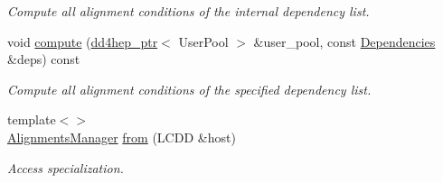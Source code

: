 \begin{DoxyCompactItemize}
\begin{DoxyCompactList}\small\item\em Compute all alignment conditions of the internal dependency list. \item\end{DoxyCompactList}\item 
void \hyperlink{class_d_d4hep_1_1_alignments_1_1_alignments_manager_ab7da4574491fb1e887cbfaabdd44c712}{compute} (\hyperlink{class_d_d4hep_1_1dd4hep__ptr}{dd4hep\_\-ptr}$<$ UserPool $>$ \&user\_\-pool, const \hyperlink{class_d_d4hep_1_1_conditions_1_1_conditions_dependency_collection}{Dependencies} \&deps) const 
\begin{DoxyCompactList}\small\item\em Compute all alignment conditions of the specified dependency list. \item\end{DoxyCompactList}\item 
{\footnotesize template$<$$>$ }\\\hyperlink{class_d_d4hep_1_1_alignments_1_1_alignments_manager}{AlignmentsManager} \hyperlink{class_d_d4hep_1_1_alignments_1_1_alignments_manager_a577f536ca106e3c3715935ac5ba210e1}{from} (LCDD \&host)
\begin{DoxyCompactList}\small\item\em Access specialization. \item\end{DoxyCompactList}\end{DoxyCompactItemize}
